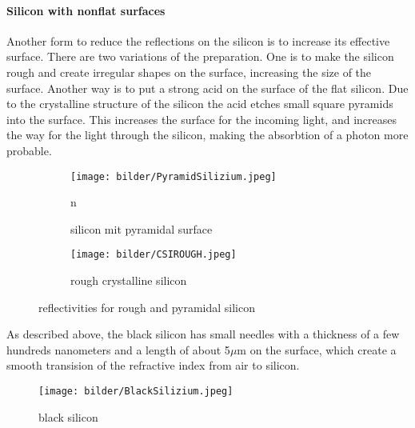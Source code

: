\paragraph{Silicon with nonflat surfaces}
Another form to reduce the reflections on the silicon is to increase its effective
surface. There are two variations of the preparation.
One is to make the silicon rough and create irregular shapes on the surface, increasing the size of the surface.
Another way is to put a strong acid on the surface of the flat silicon.
Due to the crystalline structure of the silicon the acid etches small square pyramids into the surface.
This increases the surface for the incoming light, and increases the way for the light through the silicon,
making the absorbtion of a photon more probable. 
\begin{figure}[h]
  \centering
  \begin{subfigure}[b]{0.45\textwidth}
    \texttt{[image: bilder/PyramidSilizium.jpeg]}
    \caption{silicon mit pyramidal surface}n
    \label{fig:pyramidsilizium}
  \end{subfigure}
  \begin{subfigure}[b]{0.45\textwidth}
    \texttt{[image: bilder/CSIROUGH.jpeg]}
    \caption{rough crystalline silicon}
    \label{fig:csirough}
  \end{subfigure}
  \caption{reflectivities for rough and pyramidal silicon}
\end{figure}
As described above, the black silicon has small needles with a thickness of a few hundreds nanometers and a length
of about 5$\mu$m on the surface,
which create a smooth transision of the refractive index from air to silicon.
\begin{figure}[h]
  \centering
  \texttt{[image: bilder/BlackSilizium.jpeg]}
  \caption{black silicon}
  \label{fig:blacksilizium}
\end{figure}

